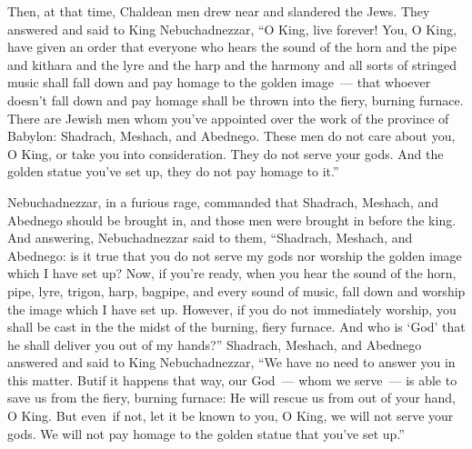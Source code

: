 \begin{inparaenum}
     Then, at that time, Chaldean men drew near and slandered the Jews.%
     They answered and said to King Nebuchadnezzar, ``O King, live forever!%
     You, O King, have given an order that everyone who hears the sound of the horn and the pipe and kithara and the lyre and the harp and the harmony and all sorts of stringed music shall fall down and pay homage to the golden image~---%
     that whoever doesn't fall down and pay homage shall be thrown into the fiery, burning furnace.%
     There are Jewish men whom you've appointed over the work of the province of Babylon: Shadrach, Meshach, and Abednego. These men do not care about you, O King, or take you into consideration. They do not serve your gods. And the golden statue you've set up, they do not pay homage to it.''\understood%
    
     Nebuchadnezzar, in a furious rage, commanded that Shadrach, Meshach, and Abednego should be brought in, and those men were brought in before the king.%
     And answering, Nebuchadnezzar said to them, ``Shadrach, Meshach, and Abednego: is it true that you do not serve my gods nor worship the golden image which I have set up?%
     Now, if you're ready, when you hear the sound of the horn, pipe, lyre, trigon, harp, bagpipe, and every sound of music, fall down and worship the image which I have set up. However, if you do not immediately worship, you shall be cast in the the midst of the burning, fiery furnace. And who is `God' that he shall deliver you out of my hands?''%
     Shadrach, Meshach, and Abednego answered and said to King Nebuchadnezzar, ``We have no need to answer you in this matter.%
     But\understood if it happens that way, our God~--- whom we serve~--- is able to save us from the fiery, burning furnace: He will rescue us from out of your hand, O King.%
     But even\understood\ if not, let it be known to you, O King, we will not serve your gods. We will not pay homage to the golden statue that you've set up.''%
    

\end{inparaenum}
